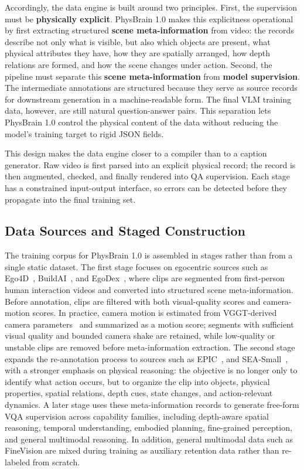 Accordingly, the data engine is built around two principles. First, the supervision must be \textbf{physically explicit}. PhysBrain 1.0 makes this explicitness operational by first extracting structured \textbf{scene meta-information} from video: the records describe not only what is visible, but also which objects are present, what physical attributes they have, how they are spatially arranged, how depth relations are formed, and how the scene changes under action. Second, the pipeline must separate this \textbf{scene meta-information} from \textbf{model supervision}. The intermediate annotations are structured because they serve as source records for downstream generation in a machine-readable form. The final VLM training data, however, are still natural question-answer pairs. This separation lets PhysBrain 1.0 control the physical content of the data without reducing the model's training target to rigid JSON fields.

This design makes the data engine closer to a compiler than to a caption generator. Raw video is first parsed into an explicit physical record; the record is then augmented, checked, and finally rendered into QA supervision. Each stage has a constrained input-output interface, so errors can be detected before they propagate into the final training set.

\subsection{Data Sources and Staged Construction}

The training corpus for PhysBrain 1.0 is assembled in stages rather than from a single static dataset. The first stage focuses on egocentric sources such as Ego4D~\cite{Ego4D_2022_CVPR}, BuildAI~\cite{buildaiegocentric10k2025}, and EgoDex~\cite{EgoDex_2025_arXiv}, where clips are segmented from first-person human interaction videos and converted into structured scene meta-information. Before annotation, clips are filtered with both visual-quality scores and camera-motion scores. In practice, camera motion is estimated from VGGT-derived camera parameters~\cite{VGGT_2025_CVPR} and summarized as a motion score; segments with sufficient visual quality and bounded camera shake are retained, while low-quality or unstable clips are removed before meta-information extraction. The second stage expands the re-annotation process to sources such as EPIC~\cite{damen2020epic}, and SEA-Small~\cite{spatial_ai_sea_small}, with a stronger emphasis on physical reasoning: the objective is no longer only to identify what action occurs, but to organize the clip into objects, physical properties, spatial relations, depth cues, state changes, and action-relevant dynamics. A later stage uses these meta-information records to generate free-form VQA supervision across capability families, including depth-aware spatial reasoning, temporal understanding, embodied planning, fine-grained perception, and general multimodal reasoning. In addition, general multimodal data such as FineVision are mixed during training as auxiliary retention data rather than re-labeled from scratch.

